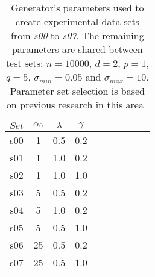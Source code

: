 \begin{table}[b!]
\setlength{\tabcolsep}{8pt}
\begin{center}
\caption{Generator's parameters used to create experimental data sets from \textit{s00} to \textit{s07}. The remaining parameters are shared between test sets: $n = 10 000$, $d = 2$, $p = 1$, $q = 5$, $\sigma_{min} = 0.05$ and $\sigma_{max} = 10$. Parameter set selection is based on previous research in this area~\cite{ghahramani2010tree}}\label{tab:parameter-configurations}
\begin{tabular}{cccccccccc}
$Set$ & $\alpha_0$ & $\lambda$ & $\gamma$ \\
\hline
s00 & 1 & 0.5 & 0.2 \\
s01 & 1 & 1.0 & 0.2 \\
s02 & 1 & 1.0 & 1.0 \\
s03 & 5 & 0.5 & 0.2 \\
s04 & 5 & 1.0 & 0.2 \\
s05 & 5 & 0.5 & 1.0 \\
s06 & 25 & 0.5 & 0.2 \\
s07 & 25 & 0.5 & 1.0 \\
\end{tabular}
\end{center}
\end{table}